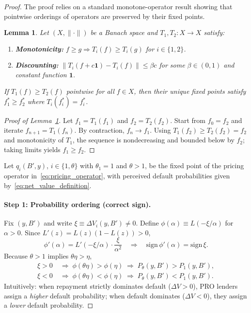 \documentclass[12pt]{article}
\theoremstyle{plain}
\newtheorem{lemma}{Lemma}
\begin{document}
\begin{proof}
	The proof relies on a standard monotone-operator result showing that pointwise orderings of operators are preserved by their fixed points.

	\begin{lemma}\label{lem:operator_dominance}
		Let $(X,\|\cdot\|)$ be a Banach space and $T_1,T_2:X\to X$ satisfy:
		\begin{enumerate}
			\item \textbf{Monotonicity:} $f\ge g \Rightarrow T_i(f)\ge T_i(g)$ for $i\in\{1,2\}$.
			\item \textbf{Discounting:} $\|T_i(f+c\mathbf{1})-T_i(f)\|\le \beta c$ for some $\beta\in(0,1)$ and constant function $\mathbf{1}$.
		\end{enumerate}
		If $T_1(f)\ge T_2(f)$ pointwise for all $f\in X$, then their unique fixed points satisfy $f_1^*\ge f_2^*$ where $T_i(f_i^*)=f_i^*$.
	\end{lemma}

	\begin{proof}[Proof of Lemma~\ref{lem:operator_dominance}]
		Let $f_1=T_1(f_1)$ and $f_2=T_2(f_2)$. Start from $f_0=f_2$ and iterate $f_{n+1}=T_1(f_n)$. By contraction, $f_n\to f_1$. Using $T_1(f_2)\ge T_2(f_2)=f_2$ and monotonicity of $T_1$, the sequence is nondecreasing and bounded below by $f_2$; taking limits yields $f_1\ge f_2$.
	\end{proof}

	Let $q_i(B',y)$, $i\in\{1,\theta\}$ with $\theta_1=1$ and $\theta>1$, be the
	fixed point of the pricing operator in~\eqref{eq:pricing_operator}, with
	perceived default probabilities given by~\eqref{eq:net_value_definition}.

	\paragraph{Step 1: Probability ordering (correct sign).}
	Fix $(y,B')$ and write $\xi\equiv \Delta V_i(y,B')\neq 0$. Define
	$\phi(\alpha)\equiv L(-\xi/\alpha)$ for $\alpha>0$. Since
	$L'(z)=L(z)(1-L(z))>0$,
	\[
		\phi'(\alpha)=L'(-\xi/\alpha)\cdot\frac{\xi}{\alpha^2}
		\quad\Rightarrow\quad
		\mathrm{sign}\,\phi'(\alpha)=\mathrm{sign}\,\xi.
	\]
	Because $\theta>1$ implies $\theta\eta>\eta$,
	\begin{align}
		\xi>0 & \;\Rightarrow\; \phi(\theta\eta)>\phi(\eta)
		\;\Rightarrow\; P_\theta(y,B')>P_1(y,B'),
		\label{eq:prob_order_pos_correct}                   \\
		\xi<0 & \;\Rightarrow\; \phi(\theta\eta)<\phi(\eta)
		\;\Rightarrow\; P_\theta(y,B')<P_1(y,B').
		\label{eq:prob_order_neg_correct}
	\end{align}
	Intuitively: when repayment strictly dominates default (\(\Delta V>0\)), PRO lenders assign a \emph{higher} default probability; when default dominates (\(\Delta V<0\)), they assign a \emph{lower} default probability.


\end{proof}
\end{document}
